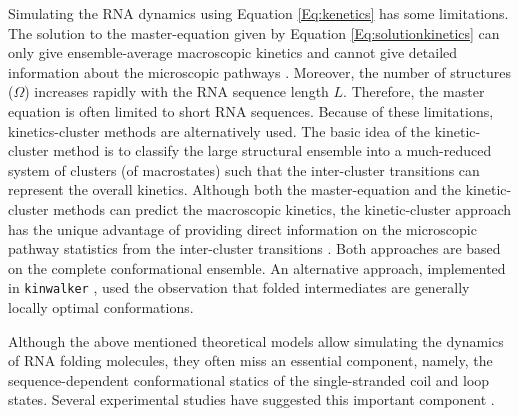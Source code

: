 Simulating the RNA dynamics using Equation \ref{Eq:kenetics} has some limitations. The solution to the master-equation given by Equation \ref{Eq:solutionkinetics} can only give ensemble-average macroscopic kinetics and cannot give detailed information about the microscopic pathways \cite{zhang06_explor_compl_foldin_kinet_rna_hairp}. Moreover, the number of structures ($\Omega$) increases rapidly with the RNA sequence length $L$. Therefore, the master equation is often limited to short RNA sequences. Because of these limitations, kinetics-cluster methods are alternatively used. The basic idea of the kinetic-cluster method is to classify the large structural ensemble into a much-reduced system of clusters (of macrostates) such that the inter-cluster transitions can represent the overall kinetics. Although both the master-equation and the kinetic-cluster methods can predict the macroscopic kinetics, the kinetic-cluster approach has the unique advantage of providing direct information on the microscopic pathway statistics from the inter-cluster transitions \cite{zhang06_explor_compl_foldin_kinet_rna_hairp}. Both approaches are based on the complete conformational ensemble. An alternative approach, implemented in \texttt{kinwalker} \cite{geis2008folding}, used the observation that folded intermediates are generally locally optimal conformations.  

Although the above mentioned theoretical models allow simulating the dynamics of RNA folding molecules, they often miss an essential component, namely, the sequence-dependent conformational statics of the single-stranded coil and loop states. Several experimental studies have suggested this important component \cite{nagel2006structural, bonnet1998kinetics}. 

